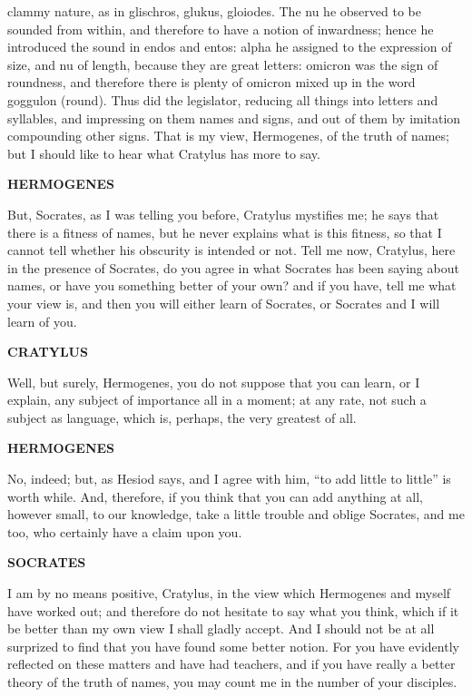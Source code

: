 \documentclass[11pt,letter]{article}
\begin{document}
clammy nature, as in glischros, glukus, gloiodes. The nu he observed to be sounded from within, and therefore to have a notion of inwardness; hence he introduced the sound in endos and entos:  alpha he assigned to the expression of size, and nu of length, because they are great letters:  omicron was the sign of roundness, and therefore there is plenty of omicron mixed up in the word goggulon (round). Thus did the legislator, reducing all things into letters and syllables, and impressing on them names and signs, and out of them by imitation compounding other signs. That is my view, Hermogenes, of the truth of names; but I should like to hear what Cratylus has more to say.

\par \textbf{HERMOGENES}
\par   But, Socrates, as I was telling you before, Cratylus mystifies me; he says that there is a fitness of names, but he never explains what is this fitness, so that I cannot tell whether his obscurity is intended or not. Tell me now, Cratylus, here in the presence of Socrates, do you agree in what Socrates has been saying about names, or have you something better of your own? and if you have, tell me what your view is, and then you will either learn of Socrates, or Socrates and I will learn of you.

\par \textbf{CRATYLUS}
\par   Well, but surely, Hermogenes, you do not suppose that you can learn, or I explain, any subject of importance all in a moment; at any rate, not such a subject as language, which is, perhaps, the very greatest of all.

\par \textbf{HERMOGENES}
\par   No, indeed; but, as Hesiod says, and I agree with him, “to add little to little” is worth while. And, therefore, if you think that you can add anything at all, however small, to our knowledge, take a little trouble and oblige Socrates, and me too, who certainly have a claim upon you.

\par \textbf{SOCRATES}
\par   I am by no means positive, Cratylus, in the view which Hermogenes and myself have worked out; and therefore do not hesitate to say what you think, which if it be better than my own view I shall gladly accept. And I should not be at all surprized to find that you have found some better notion. For you have evidently reflected on these matters and have had teachers, and if you have really a better theory of the truth of names, you may count me in the number of your disciples.
\end{document}
